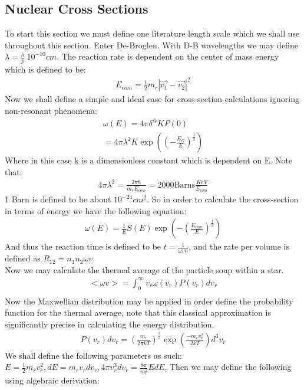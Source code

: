 \documentclass[11pt]{article}
\theoremstyle{quest}
\begin{document}
\subsection{Nuclear Cross Sections}
To start this section we must define one literature length scale which we shall use throughout this section. Enter De-Broglen. With D-B wavelengths we may define $\lambda = \frac{h}{p} ~ 10^{-10} cm$. The reaction rate is dependent on the center of mass energy which is defined to be:
\begin{align}
E_{com} = \frac{1}{2} m_r |\vec{v_1} - \vec{v_2}|^2
\end{align}
Now we shall define a simple and ideal case for cross-section calculations ignoring non-resonant phenomena:
\begin{align}
\omega(E) = 4 \pi \delta^@ K P(0)\\
= 4 \pi \lambda^2 K \exp((-\frac{E_G}{E})^\frac{1}{2}) 
\end{align}
Where in this case k is a dimensionless constant which is dependent on E. Note that:
\begin{align}
4 \pi \lambda^2 = \frac{2 \pi \hbar}{m_r E_{com}} = 2000 \text{Barns}\frac{KeV}{E_{com}}
\end{align}
1 Barn is defined to be about $10^{-24} cm^2$. So in order to calculate the cross-section in terms of energy we have the following equation:
\begin{align}
\omega(E) = \frac{1}{E} S(E) \exp(-(\frac{E_{com}}{E})^\frac{1}{2})
\end{align}
And thus the reaction time is defined to be $t = \frac{1}{\omega v n}$, and the rate per volume is defined as $R_{12} = n_1 n_2 \omega v$.\\
Now we may calculate the thermal average of the particle soup within a star.
\begin{align*}
<\omega v> = \int_0^{\infty} v_r \omega(v_{r}) P(v_r) dv_r\\
\end{align*}
Now the Maxwellian distribution may be applied in order define the probability function for the thermal average, note that this classical approximation is significantly precise in calculating the energy distribution.
\begin{align*}
P(v_r)dv_r = (\frac{m_r}{2\pi kT})^{\frac{3}{2}} \exp(\frac{-m_r v_r^2}{2 kT})d^3v_r
\end{align*}
We shall define the following parameters as such: $E = \frac{1}{2} m_r v_r^2, dE = m_r v_r dv_r, 4\pi v_r^3 dv_r = \frac{8\pi}{m_r^2} EdE$. Then we may define the following using algebraic derivation:
\end{document}
